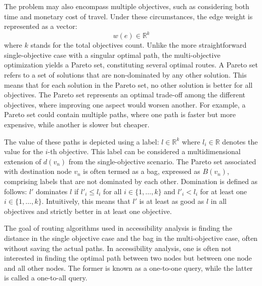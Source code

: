 The problem may also encompass multiple objectives, such as considering both time and monetary cost of travel.
Under these circumstances, the edge weight is represented as a vector:
\[ w(e) \in \mathbb{R}^k \]
where \( k \) stands for the total objectives count.
Unlike the more straightforward single-objective case with a singular optimal path, the multi-objective optimization yields a Pareto set, constituting several optimal routes.
A Pareto set refers to a set of solutions that are non-dominated by any other solution.
This means that for each solution in the Pareto set, no other solution is better for all objectives.
The Pareto set represents an optimal trade-off among the different objectives, where improving one aspect would worsen another.
For example, a Pareto set could contain multiple paths, where one path is faster but more expensive, while another is slower but cheaper.

The value of these paths is depicted using a label: \( l \in \mathbb{R}^k \) where \( l_i \in \mathbb{R} \) denotes the value for the \( i \)-th objective.
This label can be considered a multidimensional extension of \( d(v_n) \) from the single-objective scenario.
The Pareto set associated with destination node \( v_n \) is often termed as a bag, expressed as \( B(v_n) \), comprising labels that are not dominated by each other.
Domination is defined as follows: \( l' \) dominates \( l \) if \( l'_i \leq l_i \) for all \( i \in \{1, \dots, k\} \) and \( l'_i < l_i \) for at least one \( i \in \{1, \dots, k\} \).
Intuitively, this means that \(l' \) is at least as good as \( l \) in all objectives and strictly better in at least one objective.

The goal of routing algorithms used in accessibility analysis is finding the distance in the single objective case and the bag in the multi-objective case, often without saving the actual paths.
In accessibility analysis, one is often not interested in finding the optimal path between two nodes but between one node and all other nodes.
The former is known as a one-to-one query, while the latter is called a one-to-all query.

